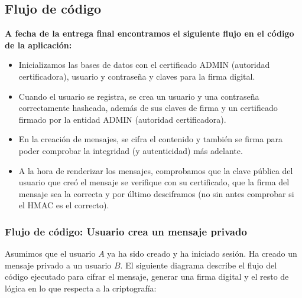 \documentclass[a4paper,11pt]{article}
\begin{document}
\vspace{0.5cm}

\subsection{Flujo de código}
\textbf{A fecha de la entrega final encontramos el siguiente flujo en el código de la aplicación:} 
\begin{itemize}
    \item Inicializamos las bases de datos con el certificado ADMIN (autoridad certificadora), usuario y contraseña y claves para la firma digital.
    \item Cuando el usuario se registra, se crea un usuario y una contraseña correctamente hasheada, además de sus claves de firma y un certificado firmado por la entidad ADMIN (autoridad certificadora).
    \item En la creación de mensajes, se cifra el contenido y también se firma para poder comprobar la integridad (y autenticidad) más adelante.
    \item A la hora de renderizar los mensajes, comprobamos que la clave pública del usuario que creó el mensaje se verifique con su certificado, que la firma del mensaje sea la correcta y por último desciframos (no sin antes comprobar si el HMAC es el correcto).
\end{itemize}

\subsubsection{Flujo de código: Usuario crea un mensaje privado}

Asumimos que el usuario $A$ ya ha sido creado y ha iniciado sesión. Ha creado un mensaje privado a un usuario $B$. El siguiente diagrama describe el flujo del código ejecutado para cifrar el mensaje, generar una firma digital y el resto de lógica en lo que respecta a la criptografía:
\end{document}
